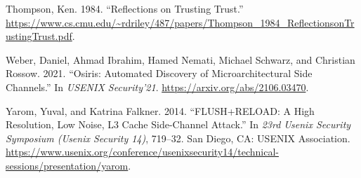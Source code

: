 \documentclass[a4paper,]{report}
\begin{document}
\leavevmode\hypertarget{ref-Thompson1984}{}%
Thompson, Ken. 1984. ``Reflections on Trusting Trust.''
\url{https://www.cs.cmu.edu/~rdriley/487/papers/Thompson_1984_ReflectionsonTrustingTrust.pdf}.

\leavevmode\hypertarget{ref-Weber2021}{}%
Weber, Daniel, Ahmad Ibrahim, Hamed Nemati, Michael Schwarz, and
Christian Rossow. 2021. ``Osiris: Automated Discovery of
Microarchitectural Side Channels.'' In \emph{USENIX Security'21}.
\url{https://arxiv.org/abs/2106.03470}.

\leavevmode\hypertarget{ref-Yarom2014}{}%
Yarom, Yuval, and Katrina Falkner. 2014. ``FLUSH+RELOAD: A High
Resolution, Low Noise, L3 Cache Side-Channel Attack.'' In \emph{23rd
Usenix Security Symposium (Usenix Security 14)}, 719--32. San Diego, CA:
USENIX Association.
\url{https://www.usenix.org/conference/usenixsecurity14/technical-sessions/presentation/yarom}.
\end{document}
